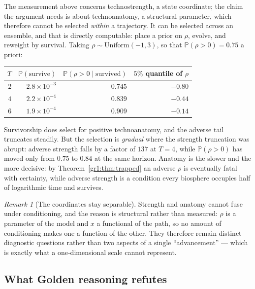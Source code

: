 \documentclass[11pt]{article}
\numberwithin{equation}{section}
\theoremstyle{plain}
\theoremstyle{definition}
\theoremstyle{remark}
\newtheorem{remark}[theorem]{Remark}
\newcommand{\PP}{\mathbb{P}}
\begin{document}
The measurement above concerns technostrength, a state coordinate; the
claim the argument needs is about technoanatomy, a structural parameter,
which therefore cannot be selected \emph{within} a trajectory. It can be
selected across an ensemble, and that is directly computable: place a
prior on $\rho$, evolve, and reweight by survival. Taking
$\rho\sim\mathrm{Uniform}(-1,3)$, so that $\PP(\rho>0)=0.75$ a priori:

\begin{center}\small
\begin{tabular}{@{}rrrr@{}}
\toprule
$T$ & $\PP(\text{survive})$ & $\PP(\rho>0\mid\text{survived})$ &
$5\%$ quantile of $\rho$\\
\midrule
$2$ & $2.8\times10^{-3}$ & $0.745$ & $-0.80$\\
$4$ & $2.2\times10^{-4}$ & $0.839$ & $-0.44$\\
$6$ & $1.9\times10^{-4}$ & $0.909$ & $-0.14$\\
\bottomrule
\end{tabular}
\end{center}

\noindent Survivorship does select for positive technoanatomy, and the
adverse tail truncates steadily. But the selection is \emph{gradual}
where the strength truncation was abrupt: adverse strength falls by a
factor of $137$ at $T=4$, while $\PP(\rho>0)$ has moved only from
$0.75$ to $0.84$ at the same horizon. Anatomy is the slower and the more
decisive: by Theorem~\ref{gr1:thm:trapped} an adverse $\rho$ is
eventually fatal with certainty, while adverse strength is a condition
every biosphere occupies half of logarithmic time and survives.

\begin{remark}[The coordinates stay separable]\label{gr:rem:separable}
Strength and anatomy cannot fuse under conditioning, and the reason is
structural rather than measured: $\rho$ is a parameter of the model and
$x$ a functional of the path, so no amount of conditioning makes one a
function of the other. They therefore remain distinct diagnostic
questions rather than two aspects of a single ``advancement'' --- which
is exactly what a one-dimensional scale cannot represent.
\end{remark}

\subsection{What Golden reasoning refutes}\label{gr:sub:refutes}
\end{document}
